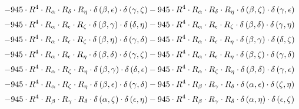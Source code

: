 \begin{subequations}
\begin{gather}
 \\[0.2em] \notag 		 - 945 \cdot R^{4} \cdot R_{\alpha{}} \cdot R_{\delta{}} \cdot R_{\eta{}} \cdot \delta{}\left(\beta{}, \epsilon{}\right) \cdot \delta{}\left(\gamma{}, \zeta{}\right)- 945 \cdot R^{4} \cdot R_{\alpha{}} \cdot R_{\delta{}} \cdot R_{\eta{}} \cdot \delta{}\left(\beta{}, \zeta{}\right) \cdot \delta{}\left(\gamma{}, \epsilon{}\right) 
 \\[0.2em] \notag 		 - 945 \cdot R^{4} \cdot R_{\alpha{}} \cdot R_{\epsilon{}} \cdot R_{\zeta{}} \cdot \delta{}\left(\beta{}, \gamma{}\right) \cdot \delta{}\left(\delta{}, \eta{}\right)- 945 \cdot R^{4} \cdot R_{\alpha{}} \cdot R_{\epsilon{}} \cdot R_{\zeta{}} \cdot \delta{}\left(\beta{}, \delta{}\right) \cdot \delta{}\left(\gamma{}, \eta{}\right) 
 \\[0.2em] \notag 		 - 945 \cdot R^{4} \cdot R_{\alpha{}} \cdot R_{\epsilon{}} \cdot R_{\zeta{}} \cdot \delta{}\left(\beta{}, \eta{}\right) \cdot \delta{}\left(\gamma{}, \delta{}\right)- 945 \cdot R^{4} \cdot R_{\alpha{}} \cdot R_{\epsilon{}} \cdot R_{\eta{}} \cdot \delta{}\left(\beta{}, \gamma{}\right) \cdot \delta{}\left(\delta{}, \zeta{}\right) 
 \\[0.2em] \notag 		 - 945 \cdot R^{4} \cdot R_{\alpha{}} \cdot R_{\epsilon{}} \cdot R_{\eta{}} \cdot \delta{}\left(\beta{}, \delta{}\right) \cdot \delta{}\left(\gamma{}, \zeta{}\right)- 945 \cdot R^{4} \cdot R_{\alpha{}} \cdot R_{\epsilon{}} \cdot R_{\eta{}} \cdot \delta{}\left(\beta{}, \zeta{}\right) \cdot \delta{}\left(\gamma{}, \delta{}\right) 
 \\[0.2em] \notag 		 - 945 \cdot R^{4} \cdot R_{\alpha{}} \cdot R_{\zeta{}} \cdot R_{\eta{}} \cdot \delta{}\left(\beta{}, \gamma{}\right) \cdot \delta{}\left(\delta{}, \epsilon{}\right)- 945 \cdot R^{4} \cdot R_{\alpha{}} \cdot R_{\zeta{}} \cdot R_{\eta{}} \cdot \delta{}\left(\beta{}, \delta{}\right) \cdot \delta{}\left(\gamma{}, \epsilon{}\right) 
 \\[0.2em] \notag 		 - 945 \cdot R^{4} \cdot R_{\alpha{}} \cdot R_{\zeta{}} \cdot R_{\eta{}} \cdot \delta{}\left(\beta{}, \epsilon{}\right) \cdot \delta{}\left(\gamma{}, \delta{}\right)- 945 \cdot R^{4} \cdot R_{\beta{}} \cdot R_{\gamma{}} \cdot R_{\delta{}} \cdot \delta{}\left(\alpha{}, \epsilon{}\right) \cdot \delta{}\left(\zeta{}, \eta{}\right) 
 \\[0.2em] \notag 		 - 945 \cdot R^{4} \cdot R_{\beta{}} \cdot R_{\gamma{}} \cdot R_{\delta{}} \cdot \delta{}\left(\alpha{}, \zeta{}\right) \cdot \delta{}\left(\epsilon{}, \eta{}\right)- 945 \cdot R^{4} \cdot R_{\beta{}} \cdot R_{\gamma{}} \cdot R_{\delta{}} \cdot \delta{}\left(\alpha{}, \eta{}\right) \cdot \delta{}\left(\epsilon{}, \zeta{}\right) 

\end{gather}
\end{subequations}
